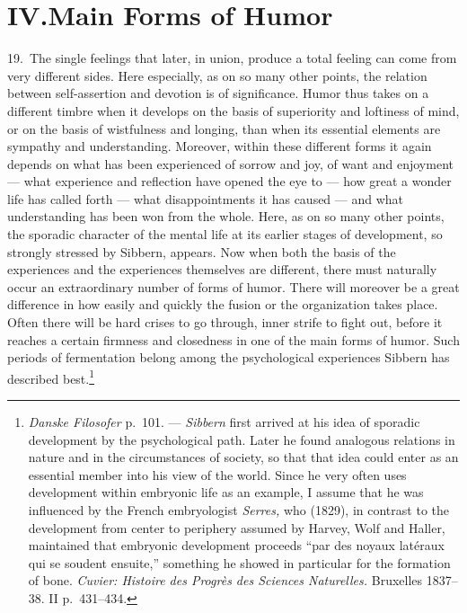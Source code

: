 \documentclass[12pt]{book}
\newcommand{\opage}[1]{\marginnote{\footnotesize\textit{[#1]}}}
\begin{document}
\chapter*{IV.\quad Main Forms of Humor}
\opage{75}19.~The single feelings that later, in union, produce a total feeling can
come from very different sides. Here especially, as on so many other points, the
relation between self-assertion and devotion is of significance. Humor thus takes on a
different timbre when it develops on the basis of superiority and loftiness of mind,
or on the basis of wistfulness and longing, than when its essential elements are
sympathy and understanding. Moreover, within these different forms it again depends on
what has been experienced of sorrow and joy, of want and enjoyment --- what experience
and reflection have opened the eye to --- how great a wonder life has called forth ---
what disappointments it has caused --- and what understanding has been won from the
whole. Here, as on so many other points, the sporadic character of the mental life at
its earlier stages of development, so strongly stressed by Sibbern, appears. Now when
both the basis of the experiences and the experiences themselves are different, there
must naturally occur an extraordinary number of forms of humor. There will moreover be
a great difference in how easily and quickly the fusion or the organization takes
place. Often there will be hard crises to go through, inner strife to fight out,
before it reaches a certain firmness and closedness in one of the main forms of humor.
Such periods of fermentation belong among the psychological experiences Sibbern has
described best.\footnote{\textit{Danske Filosofer} p.~101. --- \textit{Sibbern}
first arrived at his idea of sporadic development by the psychological path. Later he
found analogous relations in nature and in the circumstances of society, so that that
idea could enter as an essential member into his view of the world. Since he very
often uses development within embryonic life as an example, I assume that he was
influenced by the French embryologist \textit{Serres,} who (1829), in contrast to the
development from center to periphery assumed by Harvey, Wolf and Haller, maintained
that embryonic development proceeds ``par des noyaux latéraux qui se soudent
ensuite,'' something he showed in particular for the formation of bone.
\textit{Cuvier: Histoire des Progrès des Sciences Naturelles.} Bruxelles 1837--38. II
p.~431--434.}
\end{document}
